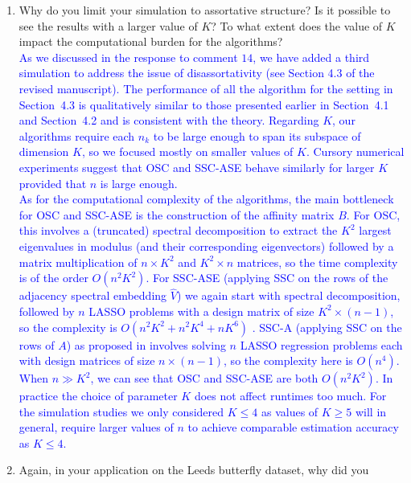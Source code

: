 \documentclass[
]{article}
\begin{document}
\begin{enumerate}
{  We have added another simulation in the supplemental materials. 
  In this simulation, we fix $n = 2048$ and $K = 3$ and vary $\rho \in (0, 1)$. 
  }
\item
  Why do you limit your simulation to assortative structure? Is it
  possible to see the results with a larger value of \(K\)? To what
  extent does the value of \(K\) impact the computational burden for the
  algorithms?\\
  \textcolor{blue}{
  As we discussed in the response to comment
  $14$, we have added a third simulation to address the issue of disassortativity (see Section
  4.3 of the revised manuscript). The performance of all the algorithm
  for the setting in Section~4.3 is qualitatively similar to those
  presented earlier in Section~4.1 and Section~4.2 and is consistent with the theory. 
  Regarding $K$, our algorithms require each $n_k$ to be large enough to span its subspace of dimension $K$, so we focused mostly on smaller values of $K$. Cursory numerical experiments suggest that OSC and SSC-ASE behave similarly for larger $K$ provided that $n$ is large enough. 
  }\\
  \textcolor{blue}{
  As for the computational complexity of the algorithms, the main bottleneck for OSC and
  SSC-ASE is the construction of the affinity matrix $B$. 
  For OSC, this involves a (truncated) spectral decomposition to extract the
  $K^2$ largest eigenvalues in modulus (and their corresponding
  eigenvectors) followed by a matrix multiplication of $n \times K^2$
  and $K^2 \times n$ matrices, so the time complexity is of the order $O(n^2 K^2)$. 
  For SSC-ASE (applying SSC on the rows of the adjacency spectral
  embedding $\hat{V}$) we again start with spectral decomposition, followed by
  $n$ LASSO problems with a design matrix of size 
  $K^2 \times (n - 1)$, so the complexity is $O(n^2 K^2 + n^2 K^4 + n K^6)$ \cite{10.1214/009053604000000067}. 
  SSC-A (applying SSC on the rows of $A$) as proposed in \cite{noroozi2019estimation} involves solving $n$ LASSO regression problems each with design matrices of size $n \times (n - 1)$, so the complexity here is $O(n^4)$. 
  When $n \gg K^2$, we can see that OSC and SSC-ASE are both $O(n^2 K^2)$. 
  In practice the choice of parameter $K$ does not affect
  runtimes too much. For the simulation studies we only considered $K
  \leq 4$ as values of $K \geq 5$ will in general, require larger values of $n$ to achieve 
  comparable estimation accuracy as $K \leq 4$. 
  }
\item
  Again, in your application on the Leeds butterfly dataset, why did you

\end{enumerate}
\end{document}
